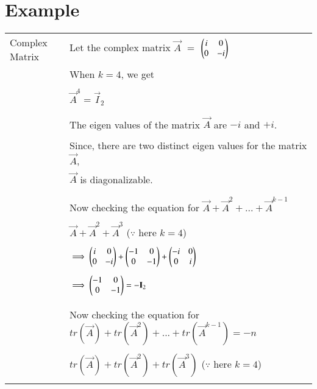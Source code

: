 \documentclass[journal,12pt]{IEEEtran}
\begin{document}
	\section{\textbf{Example}}
	\begin{longtable}{|l|l|}
		\hline
		\multirow{3}{*}{Complex Matrix }   
		& \\ 
		& Let the complex matrix $\vec{A}$ $=$ $\begin{pmatrix}i&0 \\ 0&-i\end{pmatrix}$ \\ Example
		& \\
		& When $k = 4$, we get \\
		& \\
		& \qquad \qquad \qquad $\vec{A}^4 = \vec{I}_2$ \\
		& \\
		& \\
		& The eigen values of the matrix $\vec{A}$ are $-i$ and $+i$. \\
        & \\
        & Since, there are two distinct eigen values for the matrix $\vec{A}$,\\
        & $\vec{A}$ is diagonalizable. \\
        & \\
        & \\
        & Now checking the equation for $\vec{A}+\Vec{A}^2+...+\vec{A}^{k-1}$ \\
        & \\
        & \qquad \qquad \qquad $\vec{A}+\Vec{A}^2+\vec{A}^{3}$ \qquad ($\because$ here $k=4$) \\
        & \\
        & \qquad \qquad $\implies \begin{pmatrix}i&0 \\ 0&-i\end{pmatrix} + \begin{pmatrix}-1&0 \\ 0&-1\end{pmatrix} + \begin{pmatrix}-i&0 \\ 0&i\end{pmatrix}$ \\
        & \\
        & \qquad \qquad $\implies \begin{pmatrix}-1&0 \\ 0&-1\end{pmatrix} = -\mathbf{I}_2$  \\
        & \\
        & \\
        & Now checking the equation for $tr(\vec{A})+tr(\Vec{A}^2)+...+tr(\vec{A}^{k-1}) = -n$ \\
        & \\
        & \qquad \qquad \qquad $tr(\vec{A})+tr(\Vec{A}^2)+tr(\vec{A}^{3})$ \qquad ($\because$ here $k=4$) \\
        & \\

\end{longtable}
\end{document}

